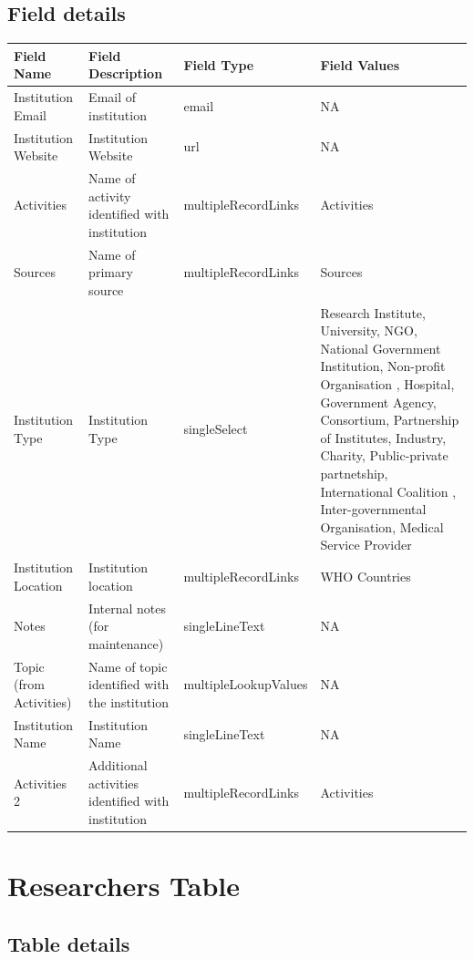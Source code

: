 \documentclass[
]{book}
\begin{document}
\hypertarget{field-details-2}{%
\subsection{Field details}\label{field-details-2}}

\begin{table}
\centering
\begin{tabular}{l|l|l|l}
\hline
\textbf{Field Name} & \textbf{Field Description} & \textbf{Field Type} & \textbf{Field Values}\\
\hline
Institution Email & Email of institution & email & NA\\
\hline
Institution Website & Institution Website & url & NA\\
\hline
Activities & Name of activity identified with institution & multipleRecordLinks & Activities\\
\hline
Sources & Name of primary source & multipleRecordLinks & Sources\\
\hline
Institution Type & Institution Type & singleSelect & Research Institute, University, NGO, National Government Institution, Non-profit Organisation , Hospital, Government Agency, Consortium, Partnership of Institutes, Industry, Charity, Public-private partnetship, International Coalition , Inter-governmental Organisation, Medical Service Provider\\
\hline
Institution Location & Institution location & multipleRecordLinks & WHO Countries\\
\hline
Notes & Internal notes (for maintenance) & singleLineText & NA\\
\hline
Topic (from Activities) & Name of topic identified with the institution & multipleLookupValues & NA\\
\hline
Institution Name & Institution Name & singleLineText & NA\\
\hline
Activities 2 & Additional activities identified with institution & multipleRecordLinks & Activities\\
\hline
\end{tabular}
\end{table}

\hypertarget{researchers-table}{%
\section{Researchers Table}\label{researchers-table}}

\hypertarget{table-details-6}{%
\subsection{Table details}\label{table-details-6}}
\end{document}
